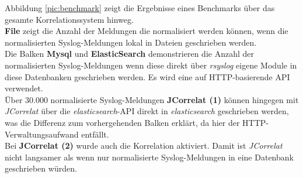 Abbildung \ref{pic:benchmark} zeigt die Ergebnisse eines Benchmarks über das gesamte 
Korrelationssystem hinweg.\\

\textbf{File} zeigt die Anzahl der Meldungen die normalisiert werden können, wenn die 
normalisierten Syslog-Meldungen lokal in Dateien geschrieben werden.\\
Die Balken \textbf{Mysql} und \textbf{ElasticSearch} demonstrieren die Anzahl der 
normalisierten Syslog-Meldungen wenn diese direkt über \textit{rsyslog} eigene Module in 
diese Datenbanken geschrieben werden. Es wird eine auf HTTP-basierende API verwendet.\\
Über 30.000 normalisierte Syslog-Meldungen \textbf{JCorrelat (1)} können hingegen mit 
\textit{JCorrelat} über die \textit{elasticsearch}-API direkt in \textit{elasticsearch} 
geschrieben werden, was die Differenz zum vorhergehenden Balken erklärt, da hier der 
HTTP-Verwaltungsaufwand entfällt.\\
Bei \textbf{JCorrelat (2)} wurde auch die Korrelation aktiviert. Damit ist 
\textit{JCorrelat} nicht langsamer als wenn nur normalisierte Syslog-Meldungen in eine 
Datenbank geschrieben würden. 
